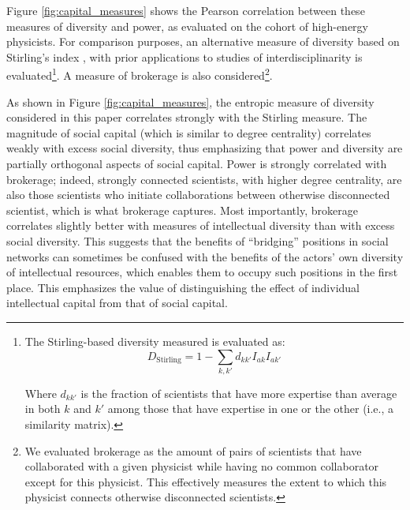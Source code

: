 \documentclass{article}
\begin{document}
Figure \ref{fig:capital_measures} shows the Pearson correlation between these measures of diversity and power, as evaluated on the cohort of high-energy physicists. For comparison purposes, an alternative measure of diversity based on Stirling's index \citep{Stirling2007}, with prior applications to studies of interdisciplinarity \citep{Porter2007,Leahey2016} is evaluated\footnote{The Stirling-based diversity measured is evaluated as: \begin{equation}
    D_{\text{Stirling}} = 1-\sum_{k,k'}d_{kk'}I_{ak}I_{ak'}
\end{equation}

Where $d_{kk'}$ is the fraction of scientists that have more expertise than average in both $k$ and $k'$ among those that have expertise in one or the other (i.e., a similarity matrix).}. A measure of brokerage is also considered\footnote{We evaluated brokerage as the amount of pairs of scientists that have collaborated with a given physicist while having no common collaborator except for this physicist. This effectively measures the extent to which this physicist connects otherwise disconnected scientists.}. 

As shown in Figure \ref{fig:capital_measures}, the entropic measure of diversity considered in this paper correlates strongly with the Stirling measure. The magnitude of social capital (which is similar to degree centrality) correlates weakly with excess social diversity, thus emphasizing that power and diversity are partially orthogonal aspects of social capital. Power is strongly correlated with brokerage; indeed, strongly connected scientists, with higher degree centrality, are also those scientists who initiate collaborations between otherwise disconnected scientist, which is what brokerage captures. Most importantly, brokerage correlates slightly better with measures of intellectual diversity than with excess social diversity. This suggests that the benefits of ``bridging'' positions in social networks can sometimes be confused with the benefits of the actors' own diversity of intellectual resources, which enables them to occupy such positions in the first place. This emphasizes the value of distinguishing the effect of individual intellectual capital from that of social capital.

\end{document}
